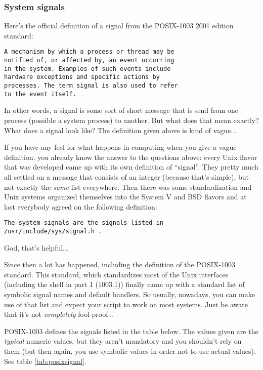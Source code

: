 \subsubsection{System signals}
Here's the official definition of a signal from the POSIX-1003 2001 edition
standard:

\scriptsize
\begin{verbatim}
A mechanism by which a process or thread may be 
notified of, or affected by, an event occurring 
in the system. Examples of such events include 
hardware exceptions and specific actions by 
processes. The term signal is also used to refer 
to the event itself.
\end{verbatim}
\normalsize

In other words, a signal is some sort of short message that is send from one
process (possible a system process) to another. But what does that mean
exactly? What does a signal look like? The definition given above is kind of
vague...

If you have any feel for what happens in computing when you give a vague
definition, you already know the answer to the questions above: every Unix
flavor that was developed came up with its own definition of ``signal''. They
pretty much all settled on a message that consists of an integer (because
that's simple), but not exactly the \emph{same} list everywhere. Then there was
some standardization and Unix systems organized themselves into the System V
and BSD flavors and at last everybody agreed on the following definition:

\scriptsize
\begin{verbatim}
The system signals are the signals listed in 
/usr/include/sys/signal.h .
\end{verbatim}
\normalsize

God, that's helpful...

Since then a lot has happened, including the definition of the POSIX-1003
standard. This standard, which standardizes most of the Unix interfaces
(including the shell in part 1 (1003.1)) finally came up with a standard list
of symbolic signal names and default handlers. So usually, nowadays, you can
make use of that list and expect your script to work on most systems. Just be
aware that it's not \emph{completely} fool-proof...

POSIX-1003 defines the signals listed in the table below. The values given are
the \emph{typical} numeric values, but they aren't mandatory and you shouldn't
rely on them (but then again, you use symbolic values in order not to use
actual values). See table \ref{tab:posixsignal}.

